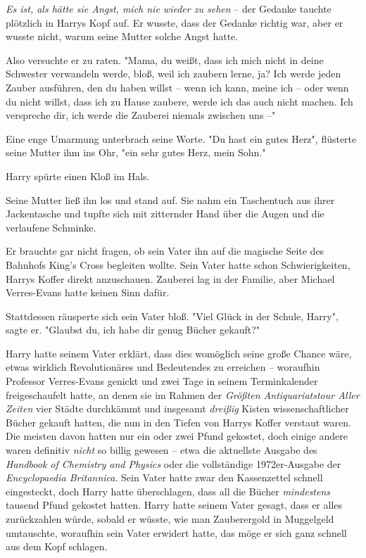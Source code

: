 {\emph{Es ist, als hätte sie Angst, mich nie wieder zu sehen} -- der Gedanke tauchte plötzlich in Harrys Kopf auf. Er wusste, dass der Gedanke richtig war, aber er wusste nicht, warum seine Mutter solche Angst hatte.

Also versuchte er zu raten. "Mama, du weißt, dass ich mich nicht in deine Schwester verwandeln werde, bloß, weil ich zaubern lerne, ja? Ich werde jeden Zauber ausführen, den du haben willst -- wenn ich kann, meine ich -- oder wenn du nicht willst, dass ich zu Hause zaubere, werde ich das auch nicht machen. Ich verspreche dir, ich werde die Zauberei niemals zwischen uns --"

Eine enge Umarmung unterbrach seine Worte. "Du hast ein gutes Herz", flüsterte seine Mutter ihm ins Ohr, "ein sehr gutes Herz, mein Sohn."

Harry spürte einen Kloß im Hals.

Seine Mutter ließ ihn los und stand auf. Sie nahm ein Taschentuch aus ihrer Jackentasche und tupfte sich mit zitternder Hand über die Augen und die verlaufene Schminke.

Er brauchte gar nicht fragen, ob sein Vater ihn auf die magische Seite des Bahnhofs King's Cross begleiten wollte. Sein Vater hatte schon Schwierigkeiten, Harrys Koffer direkt anzuschauen. Zauberei lag in der Familie, aber Michael Verres-Evans hatte keinen Sinn dafür.

Stattdessen räusperte sich sein Vater bloß. "Viel Glück in der Schule, Harry", sagte er. "Glaubst du, ich habe dir genug Bücher gekauft?"

Harry hatte seinem Vater erklärt, dass dies womöglich seine große Chance wäre, etwas wirklich Revolutionäres und Bedeutendes zu erreichen -- woraufhin Professor Verres-Evans genickt und zwei Tage in seinem Terminkalender freigeschaufelt hatte, an denen sie im Rahmen der \emph{Größten Antiquariatstour Aller Zeiten} vier Städte durchkämmt und insgesamt \emph{dreißig} Kisten wissenschaftlicher Bücher gekauft hatten, die nun in den Tiefen von Harrys Koffer verstaut waren. Die meisten davon hatten nur ein oder zwei Pfund gekostet, doch einige andere waren definitiv \emph{nicht} so billig gewesen -- etwa die aktuellste Ausgabe des \emph{Handbook of Chemistry and Physics} oder die vollständige 1972er-Ausgabe der \emph{Encyclopaedia Britannica}. Sein Vater hatte zwar den Kassenzettel schnell eingesteckt, doch Harry hatte überschlagen, dass all die Bücher \emph{mindestens} tausend Pfund gekostet hatten. Harry hatte seinem Vater gesagt, dass er alles zurückzahlen würde, sobald er wüsste, wie man Zauberergold in Muggelgeld umtauschte, woraufhin sein Vater erwidert hatte, das möge er sich ganz schnell aus dem Kopf schlagen.

}
